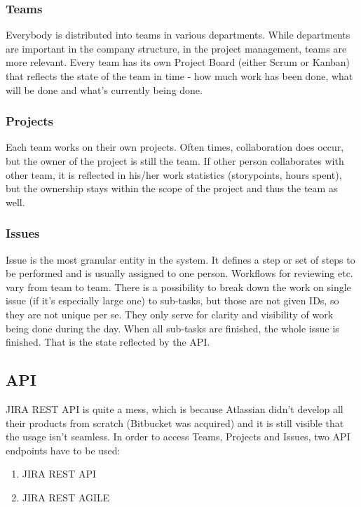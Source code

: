\subsubsection{Teams}

Everybody is distributed into teams in various departments. While departments are important in the company structure, in the project management, teams are more relevant. Every team has its own Project Board (either Scrum or Kanban) that reflects the state of the team in time - how much work has been done, what will be done and what's currently being done.

\subsubsection{Projects}

Each team works on their own projects. Often times, collaboration does occur, but the owner of the project is still the team. If other person collaborates with other team, it is reflected in his/her work statistics  (storypoints, hours spent), but the ownership stays within the scope of the project and thus the team as well.

\subsubsection{Issues}

Issue is the most granular entity in the system. It defines a step or set of steps to be performed and is usually assigned to one person. Workflows for reviewing etc. vary from team to team. There is a possibility to break down the work on single issue (if it's especially large one) to sub-tasks, but those are not given IDs, so they are not unique per se. They only serve for clarity and visibility of work being done during the day. When all sub-tasks are finished, the whole issue is finished. That is the state reflected by the API.

\subsection{API}

JIRA REST API is quite a mess, which is because Atlassian didn't develop all their products from scratch (Bitbucket was acquired) and it is still visible that the usage isn't seamless. In order to access Teams, Projects and Issues, two API endpoints have to be used:

\begin{enumerate}
	\item JIRA REST API
	\item JIRA REST AGILE
\end{enumerate}

